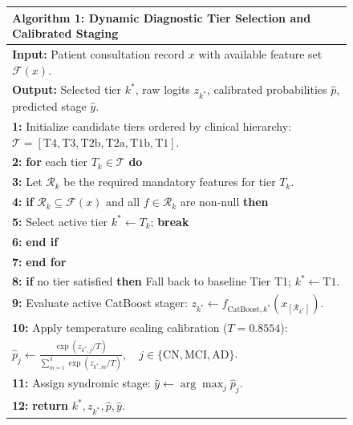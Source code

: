 \documentclass[11pt,a4paper]{article}
\begin{document}
\begin{figure}[t]
\centering
\begin{minipage}{0.95\linewidth}
\small
\begin{tabular}{|p{\linewidth}|}
\hline
\textbf{Algorithm 1: Dynamic Diagnostic Tier Selection and Calibrated Staging} \\
\hline
\textbf{Input:} Patient consultation record $x$ with available feature set $\mathcal{F}(x)$. \\
\textbf{Output:} Selected tier $k^*$, raw logits $z_{k^*}$, calibrated probabilities $\hat{p}$, predicted stage $\hat{y}$. \\
\textbf{1:} Initialize candidate tiers ordered by clinical hierarchy: $\mathcal{T} = [\text{T4}, \text{T3}, \text{T2b}, \text{T2a}, \text{T1b}, \text{T1}]$. \\
\textbf{2:} \textbf{for} each tier $T_k \in \mathcal{T}$ \textbf{do} \\
\textbf{3:} \quad Let $\mathcal{R}_k$ be the required mandatory features for tier $T_k$. \\
\textbf{4:} \quad \textbf{if} $\mathcal{R}_k \subseteq \mathcal{F}(x)$ and all $f \in \mathcal{R}_k$ are non-null \textbf{then} \\
\textbf{5:} \qquad Select active tier $k^* \leftarrow T_k$; \textbf{break} \\
\textbf{6:} \quad \textbf{end if} \\
\textbf{7:} \textbf{end for} \\
\textbf{8:} \textbf{if} no tier satisfied \textbf{then} Fall back to baseline Tier T1; $k^* \leftarrow \text{T1}$. \\
\textbf{9:} Evaluate active CatBoost stager: $z_{k^*} \leftarrow f_{\text{CatBoost}, k^*}\left(x_{[\mathcal{R}_{k^*}]}\right)$. \\
\textbf{10:} Apply temperature scaling calibration ($T = 0.8554$): \\
\qquad $\hat{p}_j \leftarrow \frac{\exp(z_{k^*, j} / T)}{\sum_{m=1}^3 \exp(z_{k^*, m} / T)}, \quad j \in \{\text{CN}, \text{MCI}, \text{AD}\}$. \\
\textbf{11:} Assign syndromic stage: $\hat{y} \leftarrow \arg\max_{j} \hat{p}_j$. \\
\textbf{12:} \textbf{return} $k^*, z_{k^*}, \hat{p}, \hat{y}$. \\
\hline
\end{tabular}
\end{minipage}
\end{figure}
\end{document}
